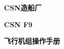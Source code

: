 \begin{titlepage}
	\begin{center}
		\vspace*{1cm}
		{\Large \textbf{CSN造船厂}}
		
		\vspace{1.5cm}
		
		{\Large \textbf{CSN F9}}
		
		\vspace{1.5cm}
		
		{\Large \textbf{飞行机组操作手册}}
		
		\vfill
		
		
		
		\vspace{1.8cm}
		
		\doclicenseThis
		
	\end{center}
\end{titlepage}